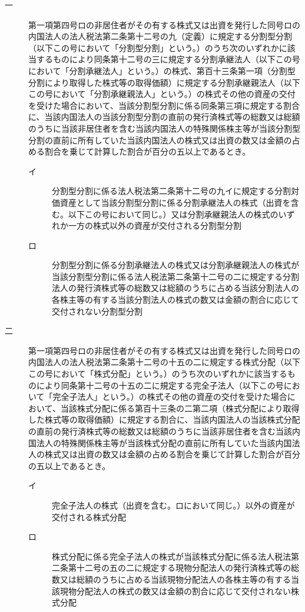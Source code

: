 \documentclass[twocolumn,a4j,10pt]{ltjtarticle}
\begin{document}
\begin{description}
\begin{description}
\item[一]第一項第四号ロの非居住者がその有する株式又は出資を発行した同号ロの内国法人の法人税法第二条第十二号の九（定義）に規定する分割型分割（以下この号において「分割型分割」という。）のうち次のいずれかに該当するものにより同条第十二号の三に規定する分割承継法人（以下この号において「分割承継法人」という。）の株式、第百十三条第一項（分割型分割により取得した株式等の取得価額）に規定する分割承継親法人（以下この号において「分割承継親法人」という。）の株式その他の資産の交付を受けた場合において、当該分割型分割に係る同条第三項に規定する割合に、当該内国法人の当該分割型分割の直前の発行済株式等の総数又は総額のうちに当該非居住者を含む当該内国法人の特殊関係株主等が当該分割型分割の直前に所有していた当該内国法人の株式又は出資の数又は金額の占める割合を乗じて計算した割合が百分の五以上であるとき。
\begin{description}
\item[イ]分割型分割に係る法人税法第二条第十二号の九イに規定する分割対価資産として当該分割型分割に係る分割承継法人の株式（出資を含む。以下この号において同じ。）又は分割承継親法人の株式のいずれか一方の株式以外の資産が交付される分割型分割
\item[ロ]分割型分割に係る分割承継法人の株式又は分割承継親法人の株式が当該分割型分割に係る法人税法第二条第十二号の二に規定する分割法人の発行済株式等の総数又は総額のうちに占める当該分割法人の各株主等の有する当該分割法人の株式の数又は金額の割合に応じて交付されない分割型分割
\end{description}
\item[二]第一項第四号ロの非居住者がその有する株式又は出資を発行した同号ロの内国法人の法人税法第二条第十二号の十五の二に規定する株式分配（以下この号において「株式分配」という。）のうち次のいずれかに該当するものにより同条第十二号の十五の二に規定する完全子法人（以下この号において「完全子法人」という。）の株式その他の資産の交付を受けた場合において、当該株式分配に係る第百十三条の二第二項（株式分配により取得した株式等の取得価額）に規定する割合に、当該内国法人の当該株式分配の直前の発行済株式等の総数又は総額のうちに当該非居住者を含む当該内国法人の特殊関係株主等が当該株式分配の直前に所有していた当該内国法人の株式又は出資の数又は金額の占める割合を乗じて計算した割合が百分の五以上であるとき。
\begin{description}
\item[イ]完全子法人の株式（出資を含む。ロにおいて同じ。）以外の資産が交付される株式分配
\item[ロ]株式分配に係る完全子法人の株式が当該株式分配に係る法人税法第二条第十二号の五の二に規定する現物分配法人の発行済株式等の総数又は総額のうちに占める当該現物分配法人の各株主等の有する当該現物分配法人の株式の数又は金額の割合に応じて交付されない株式分配

\end{description}
\end{description}
\end{description}
\end{document}
